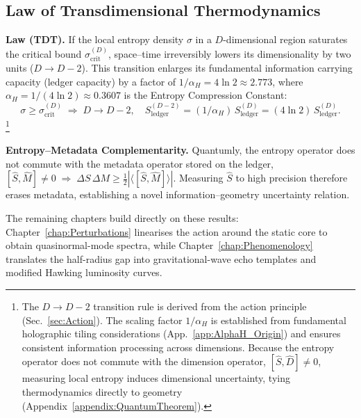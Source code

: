 \documentclass[a4paper, 12pt, oneside]{book}
\numberwithin{equation}{chapter}
\begin{document}
\subsection*{Law of Transdimensional Thermodynamics}

\begin{tcolorbox}[colback=gray!12,colframe=black]
\textbf{Law (TDT).}\;
If the local entropy density $\sigma$ in a $D$-dimensional region saturates
the critical bound $\sigma_{\mathrm{crit}}^{(D)}$, space–time irreversibly lowers its dimensionality
by two units ($D \to D-2$). This transition enlarges its fundamental information carrying capacity (ledger capacity) by a factor of $1/\alpha_H = 4\ln 2 \approx 2.773$, where $\alpha_H = 1/(4\ln 2) \approx 0.3607$ is the Entropy Compression Constant:
\[
  \sigma \ge \sigma_{\mathrm{crit}}^{(D)}
  \;\Longrightarrow\;
  D \to D-2,\quad
  S_{\mathrm{ledger}}^{(D-2)} = (1/\alpha_H)\,S_{\mathrm{ledger}}^{(D)} = (4\ln 2)\,S_{\mathrm{ledger}}^{(D)}.
\]
\footnote[0]{The $D \to D-2$ transition rule is derived from the action principle (Sec.~\ref{sec:Action}). The scaling factor $1/\alpha_H$ is established from fundamental holographic tiling considerations (App.~\ref{app:AlphaH_Origin}) and ensures consistent information processing across dimensions. Because the entropy operator does not commute with the dimension operator, \([\hat S,\hat D]\neq 0\), measuring local entropy induces dimensional uncertainty, tying thermodynamics directly to geometry (Appendix~\ref{appendix:QuantumTheorem}).}
\end{tcolorbox}


\noindent\textbf{Entropy–Metadata Complementarity.}
Quantumly, the entropy operator does not commute with the
metadata operator stored on the ledger,
\(
   [\hat S,\hat M]\neq0 \;\Longrightarrow\;
   \Delta S\,\Delta M \ge \frac12 |\langle[\hat S,\hat M]\rangle|.
\)
Measuring $\hat S$ to high precision therefore erases metadata,
establishing a novel information–geometry uncertainty relation. %

\bigskip
\noindent
The remaining chapters build directly on these results:  
Chapter~\ref{chap:Perturbations} linearises the action
around the static core to obtain quasinormal-mode spectra, while
Chapter~\ref{chap:Phenomenology} translates the half-radius gap
into gravitational-wave echo templates and modified Hawking
luminosity curves.


\end{document}
